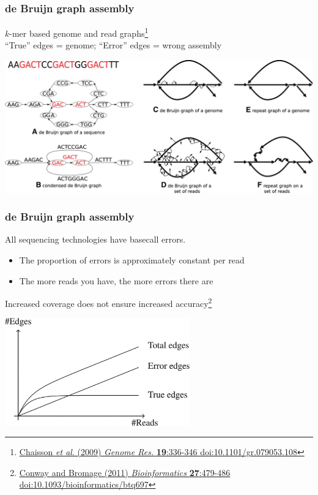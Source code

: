 \begin{frame}
  \frametitle{de Bruijn graph assembly}
  $k$-mer based genome and read graphs\footnote{\tiny{\href{http://dx.doi.org/10.1101/gr.079053.108}{Chaisson \textit{et al}. (2009) \textit{Genome Res.} \textbf{19}:336-346 doi:10.1101/gr.079053.108}}}\\
  ``True'' edges = genome; ``Error'' edges = wrong assembly
  \begin{center}
    \includegraphics[width=1\textwidth]{images/de_bruijn_repeats}
  \end{center}  
\end{frame}

\begin{frame}
  \frametitle{de Bruijn graph assembly}
  All sequencing technologies have basecall errors.
  \begin{itemize}
    \item The proportion of errors is approximately constant per read
    \item The more reads you have, the more errors there are
  \end{itemize}
  Increased coverage does not ensure increased accuracy\footnote{\tiny{\href{http://dx.doi.org/10.1093/bioinformatics/btq697}{Conway and Bromage (2011) \textit{Bioinformatics} \textbf{27}:479-486 doi:10.1093/bioinformatics/btq697}}}
  \begin{center}
    \includegraphics[width=0.6\textwidth]{images/de_bruijn_errors}
  \end{center}   
\end{frame}

